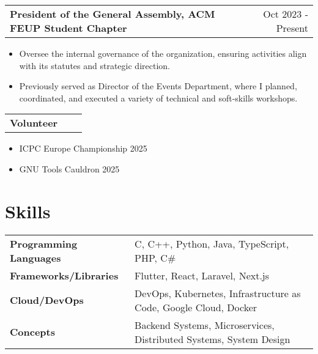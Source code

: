 \documentclass[a4paper,12pt]{article}
\makeatletter
\newenvironment{joblong}[2]
    {
    \begin{tabularx}{\linewidth}{@{}l X r@{}}
    \textbf{#1} & \hfill &  #2 \\[3.75pt]
    \end{tabularx}
    \begin{minipage}[t]{\linewidth}
    \begin{itemize}[nosep,after=\strut, leftmargin=1em, itemsep=3pt,label=--]
    }
    {
    \end{itemize}
    \end{minipage}    
    }
\makeatother
\begin{document}
\begin{joblong}{President of the General Assembly, ACM FEUP Student Chapter}{Oct 2023 - Present}
    \item Oversee the internal governance of the organization, ensuring activities align with its statutes and strategic direction.
    \item Previously served as Director of the Events Department, where I planned, coordinated, and executed a variety of technical and soft-skills workshops.
\end{joblong}

\begin{joblong}{Volunteer}{}
    \item ICPC Europe Championship 2025
    \item GNU Tools Cauldron 2025
\end{joblong}


\section{Skills}
\begin{tabularx}{\linewidth}{@{}l X@{}}
\textbf{Programming Languages} & \normalsize{C, C++, Python, Java, TypeScript, PHP, C\#} \\
\textbf{Frameworks/Libraries} & \normalsize{Flutter, React, Laravel, Next.js} \\
\textbf{Cloud/DevOps} & \normalsize{DevOps, Kubernetes, Infrastructure as Code, Google Cloud, Docker} \\
\textbf{Concepts} & \normalsize{Backend Systems, Microservices, Distributed Systems, System Design} \\
\end{tabularx}

\end{document}
